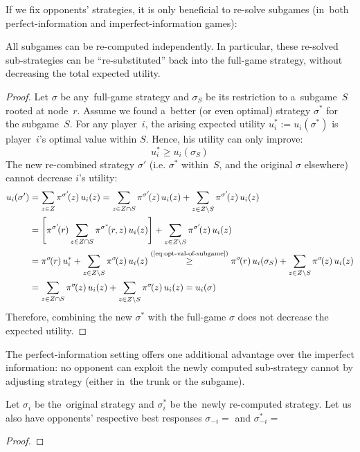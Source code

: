 If we fix opponents' strategies, it is only beneficial to re-solve subgames (in~both perfect-information and imperfect-information games):
\begin{thm}
  \label{thm:perf-info-subgames-utility}
  All subgames can be re-computed independently.
  In particular, these re-solved sub-strategies can be ``re-substituted'' back into the full-game strategy, without decreasing the total expected utility.
\end{thm}
\begin{proof}
  Let $\sigma$ be any~full-game strategy and $\sigma_S$ be its restriction to a~subgame~$S$ rooted at node~$r$.
  Assume we found a~better (or even optimal) strategy $\sigma^*$ for the subgame~$S$.
  For any player~$i$, the arising expected utility $u^*_i := u_i(\sigma^*)$ is player~$i$'s optimal value within $S$.
  Hence, his utility can only improve:
  \begin{equation}
    u^*_i \ge u_i(\sigma_S)
    \label{eq:opt-val-of-subgame}
  \end{equation}
  The new re-combined strategy $\sigma'$ (i.e. $\sigma^*$ within~$S$, and the original $\sigma$ elsewhere) cannot decrease $i$'s utility:
  \begin{align*}
    u_i(\sigma')
    &= \sum _{z \in Z} \pi^{\sigma'}\!(z) \,u_i(z)
    = \sum _{z \in Z \cap S} \pi^{\sigma'}\!(z) \,u_i(z)
    + \sum _{z \in Z \setminus S} \pi^{\sigma'}\!(z) \,u_i(z) \\
    &= \left[ \pi^{\sigma'}\!(r)\sum _{z \in Z \cap S} \pi^{\sigma^*}\!(r, z) \,u_i(z) \right]
    + \sum _{z \in Z \setminus S} \pi^{\sigma'}\!(z) \,u_i(z) \\
    &= \pi^{\sigma}\!(r) \,u_i^*
    + \sum _{z \in Z \setminus S} \pi^{\sigma}\!(z) \,u_i(z)
    \stackrel{\text{(\ref{eq:opt-val-of-subgame})}}{\ge} \pi^{\sigma}\!(r) \,u_i(\sigma_S)
    + \sum _{z \in Z \setminus S} \pi^{\sigma}\!(z) \,u_i(z) \\
    &= \sum _{z \in Z \cap S} \pi^{\sigma}\!(z) \,u_i(z)
    + \sum _{z \in Z \setminus S} \pi^{\sigma}\!(z) \,u_i(z)
    = u_i(\sigma)
  \end{align*}
  Therefore, combining the new $\sigma^*$ with the full-game $\sigma$ does not decrease the expected utility.
\end{proof}

The perfect-information setting offers one additional advantage over the imperfect information:
no opponent can exploit the newly computed sub-strategy cannot by adjusting strategy (either in~the trunk or the subgame).
\begin{thm}
  \label{thm:perf-info-subgames-unexploitability}
  Let $\sigma_i$ be the~original strategy and $\sigma_i^*$ be the~newly re-computed strategy.
  \todo Let us also have opponents' respective best responses $\sigma_{-i} = $ and $\sigma_{-i}^* = $
\end{thm}
\begin{proof}
  \todo
\end{proof}

